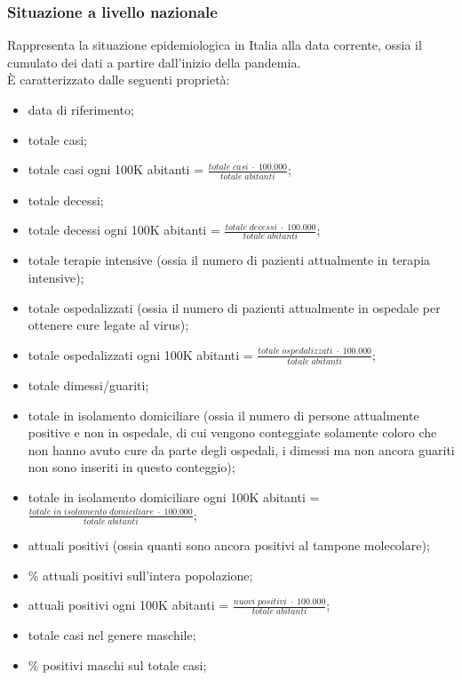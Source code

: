 \subsubsection{Situazione a livello nazionale}
\label{sss:situazione-livello-nazionale}
Rappresenta la situazione epidemiologica in Italia alla data corrente, ossia il cumulato dei dati a partire dall'inizio della pandemia.\\
È caratterizzato dalle seguenti proprietà:
\begin{itemize}
    \item data di riferimento;
    \item totale casi;
    \item totale casi ogni 100K abitanti = $\frac{totale \; casi \; \cdot \; 100.000}{totale \; abitanti}$;
    \item totale decessi;
    \item totale decessi ogni 100K abitanti = $\frac{totale \; decessi \; \cdot \; 100.000}{totale \; abitanti}$;
    \item totale terapie intensive (ossia il numero di pazienti attualmente in terapia intensive);
    \item totale ospedalizzati  (ossia il numero di pazienti attualmente in ospedale per ottenere cure legate al virus);
    \item totale ospedalizzati ogni 100K abitanti = $\frac{totale \; ospedalizzati \; \cdot \; 100.000}{totale \; abitanti}$;
    \item totale dimessi/guariti;
    \item totale in isolamento domiciliare (ossia il numero di persone attualmente positive e non in ospedale, di cui vengono conteggiate solamente coloro che non hanno avuto cure da parte degli ospedali, i dimessi ma non ancora guariti non sono inseriti in questo conteggio);
    \item totale in isolamento domiciliare ogni 100K abitanti = $\frac{totale \; in \; isolamento \; domiciliare \; \cdot \; 100.000}{totale \; abitanti}$;
    \item attuali positivi (ossia quanti sono ancora positivi al tampone molecolare);
    \item \% attuali positivi sull'intera popolazione;
    \item attuali positivi ogni 100K abitanti = $\frac{nuovi \; positivi \; \cdot \; 100.000}{totale \; abitanti}$;
    \item totale casi nel genere maschile;
    \item \% positivi maschi sul totale casi;

\end{itemize}
